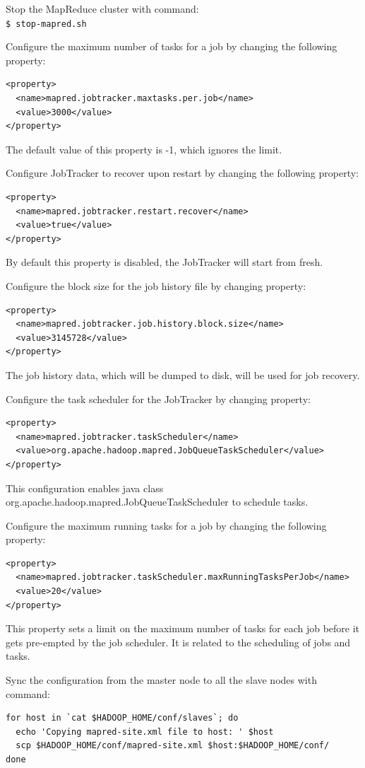 Stop the MapReduce cluster with command:\\
\verb|$ stop-mapred.sh|

Configure the maximum number of tasks for a job by changing the following property:
\lstset{style=bashstyle}
\begin{lstlisting}
<property>
  <name>mapred.jobtracker.maxtasks.per.job</name>
  <value>3000</value>
</property>
\end{lstlisting}
The default value of this property is -1, which ignores the limit.

Configure JobTracker to recover upon restart by changing the following property:
\lstset{style=bashstyle}
\begin{lstlisting}
<property>
  <name>mapred.jobtracker.restart.recover</name>
  <value>true</value>
</property>
\end{lstlisting}
By default this property is disabled, the JobTracker will start from fresh.

Configure the block size for the job history file by changing property:
\lstset{style=bashstyle}
\begin{lstlisting}
<property>
  <name>mapred.jobtracker.job.history.block.size</name>
  <value>3145728</value>
</property>
\end{lstlisting}

The job history data, which will be dumped to disk, will be used for job recovery.

Configure the task scheduler for the JobTracker by changing property:
\lstset{style=bashstyle}
\begin{lstlisting}
<property>
  <name>mapred.jobtracker.taskScheduler</name>
  <value>org.apache.hadoop.mapred.JobQueueTaskScheduler</value>
</property>
\end{lstlisting}
This configuration enables java class org.apache.hadoop.mapred.JobQueueTaskScheduler to schedule tasks.


Configure the maximum running tasks for a job by changing the following property:
\lstset{style=bashstyle}
\begin{lstlisting}
<property>
  <name>mapred.jobtracker.taskScheduler.maxRunningTasksPerJob</name>
  <value>20</value>
</property>
\end{lstlisting}

This property sets a limit on the maximum number of tasks for each job before it gets pre-empted by the job scheduler. It is related to the scheduling of jobs and tasks.

Sync the configuration from the master node to all the slave nodes with command:
\lstset{style=bashstyle}
\begin{lstlisting}
for host in `cat $HADOOP_HOME/conf/slaves`; do
  echo 'Copying mapred-site.xml file to host: ' $host
  scp $HADOOP_HOME/conf/mapred-site.xml $host:$HADOOP_HOME/conf/
done
\end{lstlisting}


